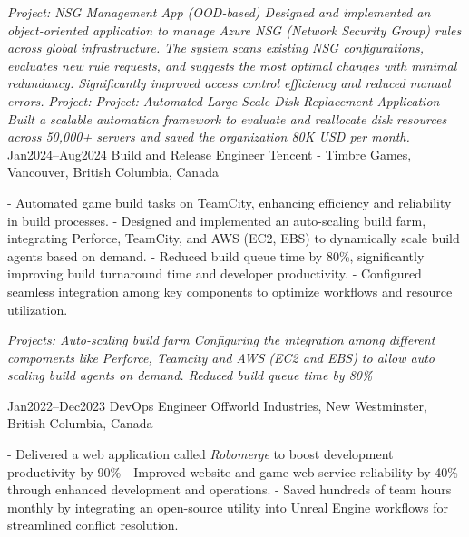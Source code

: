 \documentclass[9pt]{developercv} %
\begin{document}
\begin{entrylist}
{			\textit{Project: NSG Management App (OOD-based)\newline
			Designed and implemented an object-oriented application to manage Azure NSG (Network Security Group) rules across global infrastructure. The system scans existing NSG configurations, evaluates new rule requests, and suggests the most optimal changes with minimal redundancy. Significantly improved access control efficiency and reduced manual errors.\newline}\newline
            \textit{Project: Project: Automated Large-Scale Disk Replacement Application\newline
            Built a scalable automation framework to evaluate and reallocate disk resources across 50,000+ servers and saved the organization 80K USD per month.}\newline\newline
        }
	\entry
		{Jan2024--Aug2024}
		{Build and Release Engineer}
		{Tencent - Timbre Games, Vancouver, British Columbia, Canada}
		{
            - Automated game build tasks on TeamCity, enhancing efficiency and reliability in build processes. \newline
            - Designed and implemented an auto-scaling build farm, integrating Perforce, TeamCity, and AWS (EC2, EBS) to dynamically scale build agents based on demand.\newline
            - Reduced build queue time by 80\%, significantly improving build turnaround time and developer productivity.\newline
            - Configured seamless integration among key components to optimize workflows and resource utilization.\newline

            \textit{Projects: Auto-scaling build farm\newline
            Configuring the integration among different compoments like Perforce, Teamcity and AWS (EC2 and EBS) to allow 
            auto scaling build agents on demand. Reduced build queue time by 80\%\newline}
        }
	\entry
		{Jan2022--Dec2023}
		{DevOps Engineer}
		{Offworld Industries, New Westminster, British Columbia, Canada}
		{
            - Delivered a web application called \textit{Robomerge} to boost development productivity by 90\%\newline
            - Improved website and game web service reliability by 40\% through enhanced development and operations.\newline
            - Saved hundreds of team hours monthly by integrating an open-source utility into Unreal Engine workflows for streamlined conflict resolution.\newline

}
\end{entrylist}
\end{document}
